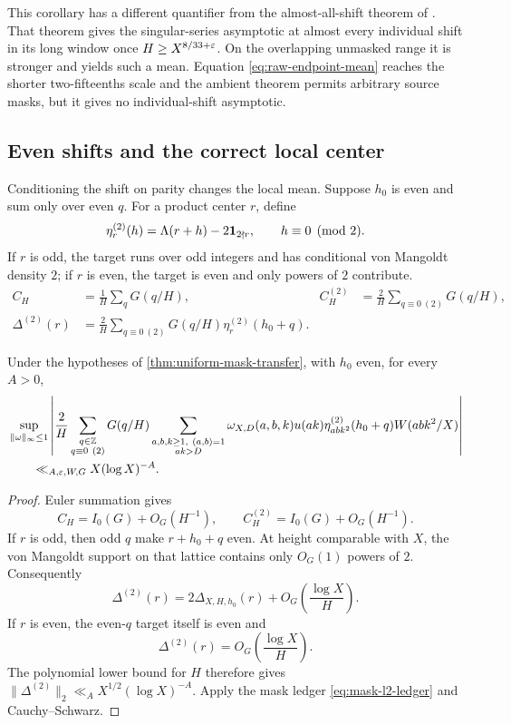 This corollary has a different quantifier from the almost-all-shift theorem
of \citet{MatomakiRadziwillTao2019}.  That theorem gives the
singular-series asymptotic at almost every individual shift in its long
window once $H\geq X^{8/33+\varepsilon}$.  On the overlapping unmasked range it
is stronger and yields such a mean.  Equation \eqref{eq:raw-endpoint-mean}
reaches the shorter two-fifteenths scale and the ambient theorem permits
arbitrary source masks, but it gives no individual-shift asymptotic.

\subsection{Even shifts and the correct local center}

Conditioning the shift on parity changes the local mean.  Suppose $h_0$ is
even and sum only over even $q$.  For a product center $r$, define
\begin{equation}
 \eta_r^{(2)}(h)=
 \Lambda(r+h)-2\mathbf 1_{2\nmid r},
 \qquad h\equiv0\pmod2.
 \label{eq:parity-conditioned-residual}
\end{equation}
If $r$ is odd, the target runs over odd integers and has conditional von
Mangoldt density $2$; if $r$ is even, the target is even and only powers of
$2$ contribute.
\begin{align}
 C_H&=\frac1H\sum_qG(q/H),
 &
 C_H^{(2)}&=\frac2H\sum_{q\equiv0\ (2)}G(q/H),
 \label{eq:parity-lattice-masses}\\
 \Delta^{(2)}(r)
 &=\frac2H\sum_{q\equiv0\ (2)}
 G(q/H)\eta_r^{(2)}(h_0+q).
 \label{eq:parity-translated-residual}
\end{align}

\begin{theorem}
\label{thm:even-mask-transfer}
Under the hypotheses of \cref{thm:uniform-mask-transfer}, with $h_0$ even,
for every $A>0$,
\begin{align}
 &\sup_{\|\omega\|_\infty\leq1}
 \left|\frac2H
 \sum_{\substack{q\in\mathbb Z\\q\equiv0\ (2)}}G(q/H)
 \sum_{\substack{a,b,k\geq1,\ (a,b)=1\\ak>D}}
 \omega_{X,D}(a,b,k)u(ak)
 \eta_{abk^2}^{(2)}(h_0+q)W(abk^2/X)
 \right|
 \notag\\
 &\qquad\ll_{A,\varepsilon,W,G}X(\log X)^{-A}.
 \label{eq:even-mask-transfer}
\end{align}
\end{theorem}

\begin{proof}
Euler summation gives
\[
 C_H=I_0(G)+O_G(H^{-1}),
 \qquad
 C_H^{(2)}=I_0(G)+O_G(H^{-1}).
\]
If $r$ is odd, then odd $q$ make $r+h_0+q$ even.  At height comparable
with $X$, the von Mangoldt support on that lattice contains only
$O_G(1)$ powers of $2$.  Consequently
\[
 \Delta^{(2)}(r)
 =2\Delta_{X,H,h_0}(r)
 +O_G\!\left(\frac{\log X}{H}\right).
\]
If $r$ is even, the even-$q$ target itself is even and
\[
 \Delta^{(2)}(r)
 =O_G\!\left(\frac{\log X}{H}\right).
\]
The polynomial lower bound for $H$ therefore gives
$\|\Delta^{(2)}\|_2\ll_A X^{1/2}(\log X)^{-A}$.
Apply the mask ledger
\eqref{eq:mask-l2-ledger} and Cauchy--Schwarz.
\end{proof}

